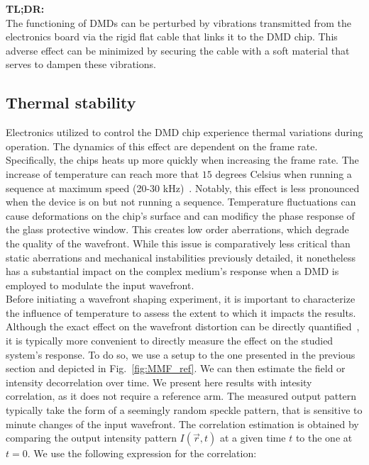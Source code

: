 \documentclass[12pt]{iopart}
\begin{document}
\begin{tldr}
  \textbf{TL;DR:}\\
  The functioning of DMDs can be perturbed by vibrations transmitted from the electronics board
  via the rigid flat cable that links it to the DMD chip.
  This adverse effect can be minimized by securing the cable with a soft material
  that serves to dampen these vibrations.
\end{tldr}

\subsection{Thermal stability}

Electronics utilized to control the DMD chip experience thermal variations during operation.
The dynamics of this effect are dependent on the frame rate.
Specifically, the chips heats up more quickly when increasing the frame rate.
The increase of temperature can reach more that $15$ degrees Celsius
when running a sequence at maximum speed (20-30 kHz)~\cite{Rudolf2021thermal}.
Notably, this effect is less pronounced when the device is on but not running a sequence.
Temperature fluctuations can cause deformations on the chip's surface
and can modificy the phase response of the glass protective window.
This creates low order aberrations, which degrade the quality of the wavefront.
While this issue is comparatively less critical than static aberrations and mechanical instabilities
previously detailed,
it nonetheless has a substantial impact on the complex medium's response
when a DMD is employed to modulate the input wavefront.\\



Before initiating a wavefront shaping experiment,
it is important to characterize the influence of temperature
to assess the extent to which it impacts the results.
Although the exact effect on the wavefront distortion can be directly quantified~\cite{Rudolf2021thermal},
it is typically more convenient
to directly measure the effect on the studied system's response.
To do so, we use a setup to the one presented in the previous section
and depicted in Fig.~\ref{fig:MMF_ref}.
We can then estimate the field or intensity decorrelation over time.
We present here results with intesity correlation, as it does not require a reference arm.
The measured output pattern typically take the form of a seemingly random speckle pattern,
that is sensitive to minute changes of the input wavefront.
The correlation estimation is obtained by comparing the output intensity pattern
$I(\vec{r}, t)$ at a given time $t$
to the one at $t=0$.
We use the following expression for the correlation:
\end{document}
